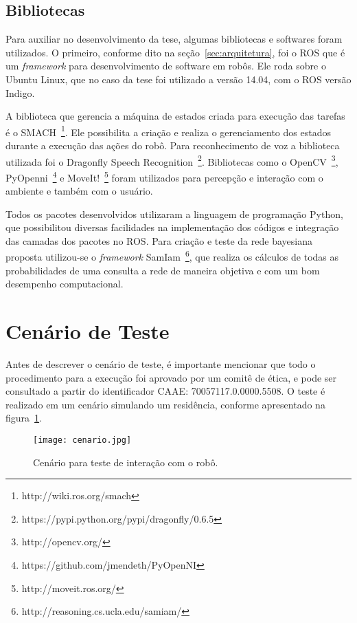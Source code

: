 \subsection{Bibliotecas}
\label{sec:bibliotecas}
Para auxiliar no desenvolvimento da tese, algumas bibliotecas e softwares foram utilizados. O primeiro, conforme dito na seção~\ref{sec:arquitetura}, foi o ROS que é um \emph{framework} para desenvolvimento de software em robôs. Ele roda sobre o Ubuntu Linux, que no caso da tese foi utilizado a versão 14.04, com o ROS versão Indigo.

A biblioteca que gerencia a máquina de estados criada para execução das tarefas é o SMACH~\footnote{http://wiki.ros.org/smach}. Ele possibilita a criação e realiza o gerenciamento dos estados durante a execução das ações do robô. Para reconhecimento de voz a biblioteca utilizada foi o Dragonfly Speech Recognition~\footnote{https://pypi.python.org/pypi/dragonfly/0.6.5}. Bibliotecas como o OpenCV~\footnote{http://opencv.org/}, PyOpenni~\footnote{https://github.com/jmendeth/PyOpenNI} e MoveIt!~\footnote{http://moveit.ros.org/} foram utilizados para percepção e interação com o ambiente e também com o usuário.

Todos os pacotes desenvolvidos utilizaram a linguagem de programação Python, que possibilitou diversas facilidades na implementação dos códigos e integração das camadas dos pacotes no ROS. Para criação e teste da rede bayesiana proposta utilizou-se o \emph{framework} SamIam~\footnote{http://reasoning.cs.ucla.edu/samiam/}, que realiza os cálculos de todas as probabilidades de uma consulta a rede de maneira objetiva e com um bom desempenho computacional.

\section{Cenário de Teste} %
\label{sec:cenario}
Antes de descrever o cenário de teste, é importante mencionar que todo o procedimento para a execução foi aprovado por um comitê de ética, e pode ser consultado a partir do identificador CAAE: 70057117.0.0000.5508. O teste é realizado em um cenário simulando um residência, conforme apresentado na figura~\ref{fig:cenario}.

\begin{figure}[ht!]
	\centering
	\begin{minipage}{\textwidth}
		\caption{Cenário para teste de interação com o robô.}
		\texttt{[image: cenario.jpg]}
		\label{fig:cenario}
	\end{minipage}
\end{figure}

